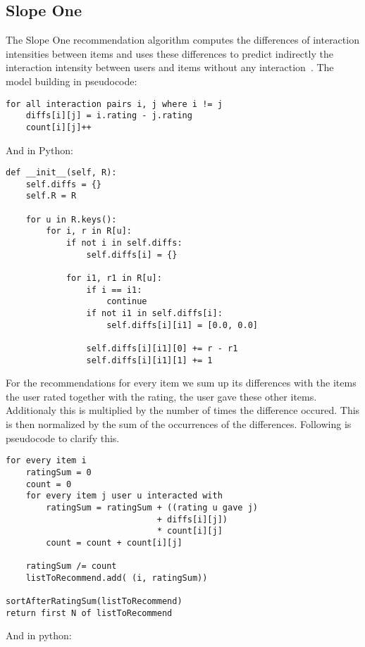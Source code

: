\subsection{Slope One}
The Slope One recommendation algorithm computes the differences of
interaction intensities between items and uses these differences to 
predict indirectly the interaction intensity between users and items
without any interaction~\cite{DBLP:journals/corr/abs-cs-0702144}.
The model building in pseudocode:
\begin{lstlisting}
for all interaction pairs i, j where i != j
    diffs[i][j] = i.rating - j.rating
    count[i][j]++
\end{lstlisting}
And in Python:
\begin{lstlisting}
def __init__(self, R):
    self.diffs = {}
    self.R = R

    for u in R.keys():
        for i, r in R[u]:
            if not i in self.diffs:
                self.diffs[i] = {}

            for i1, r1 in R[u]:
                if i == i1:
                    continue
                if not i1 in self.diffs[i]:
                    self.diffs[i][i1] = [0.0, 0.0]

                self.diffs[i][i1][0] += r - r1
                self.diffs[i][i1][1] += 1
\end{lstlisting}
For the recommendations for every item we sum up its differences with
the items the user rated together with the rating, the user gave these
other items. Additionaly this is multiplied by the number of times the
difference occured. This is then normalized by the sum of the occurrences
of the differences. Following is pseudocode to clarify this.
\begin{lstlisting}
for every item i
    ratingSum = 0
    count = 0
    for every item j user u interacted with
        ratingSum = ratingSum + ((rating u gave j) 
                              + diffs[i][j])
                              * count[i][j]
        count = count + count[i][j]

    ratingSum /= count
    listToRecommend.add( (i, ratingSum))

sortAfterRatingSum(listToRecommend)
return first N of listToRecommend
\end{lstlisting}
And in python:
